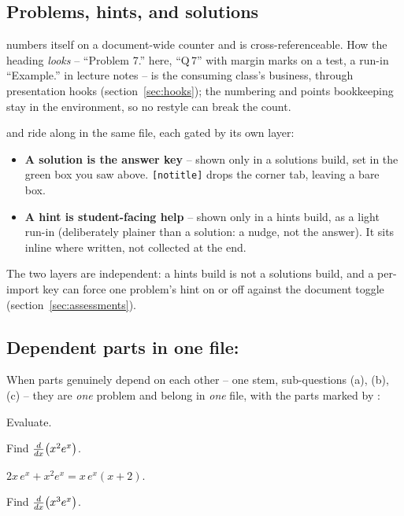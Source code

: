 \subsection{Problems, hints, and solutions}

 numbers itself on a document-wide counter and is
cross-referenceable. How the heading \emph{looks} -- ``Problem 7.'' here,
``Q\,7'' with margin marks on a test, a run-in ``Example.'' in lecture notes --
is the consuming class's business, through presentation hooks
(section~\ref{sec:hooks}); the numbering and points bookkeeping stay in the
environment, so no restyle can break the count.

 and  ride along in the same file, each gated by its
own layer:

\begin{itemize}
  \item \textbf{A solution is the answer key} -- shown only in a solutions
    build, set in the green box you saw above. \texttt{[notitle]}
    drops the corner tab, leaving a bare box.
  \item \textbf{A hint is student-facing help} -- shown only in a hints build,
    as a light run-in (deliberately plainer than a solution: a nudge, not the
    answer). It sits inline where written, not collected at the end.
\end{itemize}

The two layers are independent: a hints build is not a solutions build, and a
per-import key can force one problem's hint on or off against the document
toggle (section~\ref{sec:assessments}).

\subsection{Dependent parts in one file: }

When parts genuinely depend on each other -- one stem, sub-questions (a), (b),
(c) -- they are \emph{one} problem and belong in \emph{one} file, with the
parts marked by :

\begin{manexample}
\begin{problem}
  Evaluate.
  \begin{qparts}
    \qpart Find ${\frac{d}{dx}}{\left(x^{2}e^{x}\right)}$.
    \begin{solution}[notitle]
      $2x\,e^{x} + x^{2}e^{x} = x\,e^{x}(x+2)$.
    \end{solution}
    \qpart Find ${\frac{d}{dx}}{\left(x^{3}e^{x}\right)}$.
  \end{qparts}
\end{problem}
\end{manexample}

